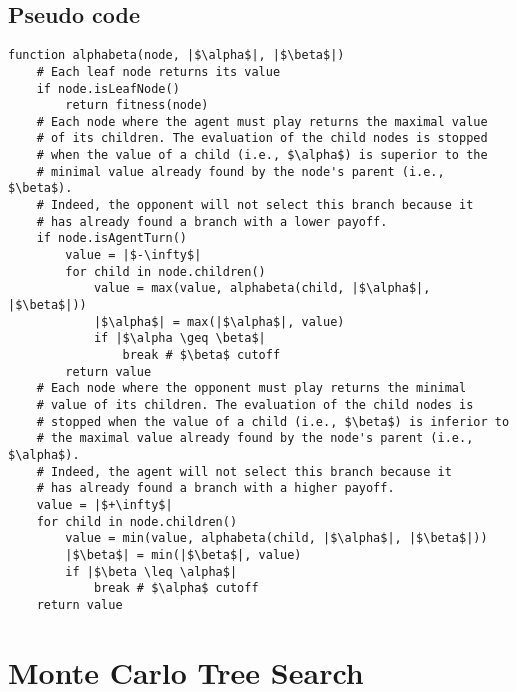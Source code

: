 \documentclass[11pt,fleqn]{book} %
\begin{document}
\subsection*{Pseudo code}

\begin{verbatim}
function alphabeta(node, |$\alpha$|, |$\beta$|)
    # Each leaf node returns its value
    if node.isLeafNode()
        return fitness(node)
    # Each node where the agent must play returns the maximal value 
    # of its children. The evaluation of the child nodes is stopped 
    # when the value of a child (i.e., $\alpha$) is superior to the 
    # minimal value already found by the node's parent (i.e., $\beta$).
    # Indeed, the opponent will not select this branch because it 
    # has already found a branch with a lower payoff.
    if node.isAgentTurn()
        value = |$-\infty$|
        for child in node.children()
            value = max(value, alphabeta(child, |$\alpha$|, |$\beta$|))
            |$\alpha$| = max(|$\alpha$|, value)
            if |$\alpha \geq \beta$|
                break # $\beta$ cutoff
        return value
    # Each node where the opponent must play returns the minimal 
    # value of its children. The evaluation of the child nodes is 
    # stopped when the value of a child (i.e., $\beta$) is inferior to 
    # the maximal value already found by the node's parent (i.e., $\alpha$).
    # Indeed, the agent will not select this branch because it 
    # has already found a branch with a higher payoff.
    value = |$+\infty$|
    for child in node.children()
        value = min(value, alphabeta(child, |$\alpha$|, |$\beta$|))
        |$\beta$| = min(|$\beta$|, value)
        if |$\beta \leq \alpha$|
            break # $\alpha$ cutoff
    return value
\end{verbatim}

\section{Monte Carlo Tree Search} \label{sec:MCTS}
\end{document}
